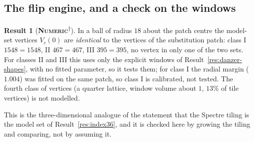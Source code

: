 \documentclass[11pt]{article}
\newcommand{\numeric}{\textbf{\textsc{Numeric}}}
\newcommand{\snap}{\textsuperscript{$\dagger$}}      %
\theoremstyle{definition}
\newtheorem{result}{Result}
\begin{document}
\subsection{The flip engine, and a check on the windows}\label{sec:danzer-engine}
\begin{result}[\numeric\snap]\label{res:danzer-modelset}
In a ball of radius $18$ about the patch centre the model-set vertices $V_c(0)$ are \emph{identical} to the vertices of the substitution patch: class I $1548=1548$, II $467=467$, III $395=395$, no vertex in only one of the two sets. For classes II and III this uses only the explicit windows of Result~\ref{res:danzer-shapes}, with no fitted parameter, so it tests them; for class I the radial margin ($1.004$) was fitted on the same patch, so class I is calibrated, not tested. The fourth class of vertices (a quarter lattice, window volume about $1$, $13\%$ of tile vertices) is not modelled.
\end{result}
This is the three-dimensional analogue of the statement that the Spectre tiling is the model set of Result~\ref{res:index36}, and it is checked here by growing the tiling and comparing, not by assuming it.
\end{document}
